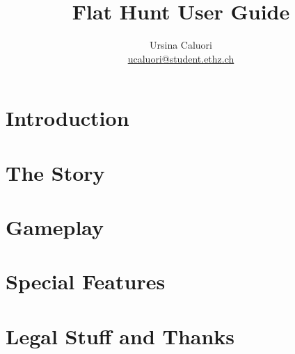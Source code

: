 \documentclass[a4paper,titlepage,12pt]{article}
\title{\textbf{Flat Hunt User Guide}}
\author{Ursina Caluori\\ \href{mailto: ucaluori@student.ethz.ch}{ucaluori@student.ethz.ch}}
\begin{document}
  \maketitle
  
  \tableofcontents
  
  \pagebreak

  
 

  \section{Introduction}
    
  \section{The Story}
    
  \section{Gameplay}
     
  \section{Special Features}
    
  \section{Legal Stuff and Thanks}
    
    
    \hyperref[ugref]{}    
    
    
\end{document}
